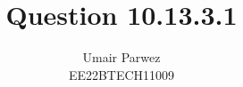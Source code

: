 \documentclass[]{article}
\title{Question 10.13.3.1}
\author{Umair Parwez \\ EE22BTECH11009}
\date{}
\begin{document}
\maketitle
\providecommand{\pr}[1]{\ensuremath{\Pr\left(#1\right)}}
\providecommand{\prt}[2]{\ensuremath{p_{#1}^{\left(#2\right)} }}        %
\providecommand{\qfunc}[1]{\ensuremath{Q\left(#1\right)}}
\providecommand{\sbrak}[1]{\ensuremath{{}\left[#1\right]}}
\providecommand{\lsbrak}[1]{\ensuremath{{}\left[#1\right.}}
\providecommand{\rsbrak}[1]{\ensuremath{{}\left.#1\right]}}
\providecommand{\brak}[1]{\ensuremath{\left(#1\right)}}
\providecommand{\lbrak}[1]{\ensuremath{\left(#1\right.}}
\providecommand{\rbrak}[1]{\ensuremath{\left.#1\right)}}
\providecommand{\cbrak}[1]{\ensuremath{\left\{#1\right\}}}
\providecommand{\lcbrak}[1]{\ensuremath{\left\{#1\right.}}
\providecommand{\rcbrak}[1]{\ensuremath{\left.#1\right\}}}
\newcommand{\sgn}{\mathop{\mathrm{sgn}}}
\providecommand{\abs}[1]{\left\vert#1\right\vert}
\providecommand{\res}[1]{\Res\displaylimits_{#1}} 
\providecommand{\norm}[1]{\left\lVert#1\right\rVert}
\providecommand{\mtx}[1]{\mathbf{#1}}
\providecommand{\mean}[1]{E\left[ #1 \right]}
\providecommand{\cond}[2]{#1\middle|#2}
\providecommand{\fourier}{\overset{\mathcal{F}}{ \rightleftharpoons}}
\newenvironment{amatrix}[1]{%
  \left(\begin{array}{@{}*{#1}{c}|c@{}}
}{%
  \end{array}\right)
}
\newcommand{\solution}{\noindent \textbf{Solution: }}
\newcommand{\cosec}{\,\text{cosec}\,}
\providecommand{\dec}[2]{\ensuremath{\overset{#1}{\underset{#2}{\gtrless}}}}
\newcommand{\myvec}[1]{\ensuremath{\begin{pmatrix}#1\end{pmatrix}}}
\newcommand{\mydet}[1]{\ensuremath{\begin{vmatrix}#1\end{vmatrix}}}
\newcommand{\myaugvec}[2]{\ensuremath{\begin{amatrix}{#1}#2\end{amatrix}}}
\providecommand{\rank}{\text{rank}}
\providecommand{\pr}[1]{\ensuremath{\Pr\left(#1\right)}}
\providecommand{\qfunc}[1]{\ensuremath{Q\left(#1\right)}}
	\newcommand*{\permcomb}[4][0mu]{{{}^{#3}\mkern#1#2_{#4}}}
\newcommand*{\perm}[1][-3mu]{\permcomb[#1]{P}}
\newcommand*{\comb}[1][-1mu]{\permcomb[#1]{C}}
\end{document}
